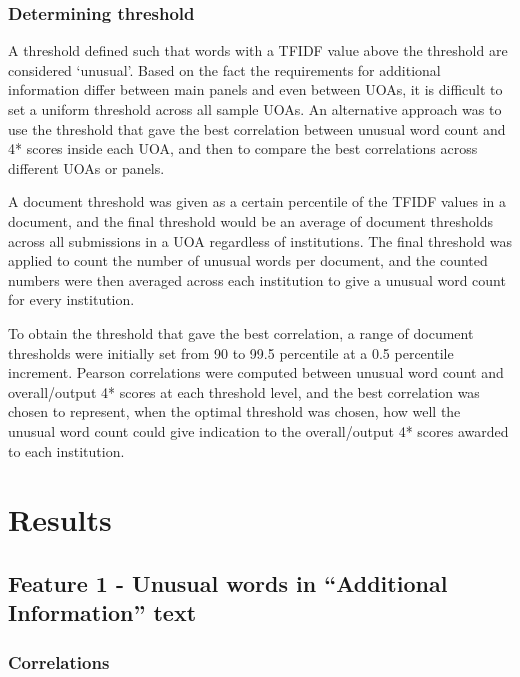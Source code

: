 \documentclass[a4paper, 11pt]{article}
\begin{document}
\subsubsection{Determining threshold}

A threshold defined such that words with a TFIDF value above the threshold are considered ‘unusual’. Based on the fact the requirements for additional information differ between main panels and even between UOAs, it is difficult to set a uniform threshold across all sample UOAs. An alternative approach was to use the threshold that gave the best correlation between unusual word count and 4* scores inside each UOA, and then to compare the best correlations across different UOAs or panels. 

A document threshold was given as a certain percentile of the TFIDF values in a document, and the final threshold would be an average of document thresholds across all submissions in a UOA regardless of institutions. The final threshold was applied to count the number of unusual words per document, and the counted numbers were then averaged across each institution to give a unusual word count for every institution.

To obtain the threshold that gave the best correlation, a range of document thresholds were initially set from 90 to 99.5 percentile at a 0.5 percentile increment. Pearson correlations were computed between unusual word count and overall/output 4* scores at each threshold level, and the best correlation was chosen to represent, when the optimal threshold was chosen, how well the unusual word count could give indication to the overall/output 4* scores awarded to each institution.




\section{Results}

\subsection{Feature 1 - Unusual words in ``Additional Information'' text}

\subsubsection{Correlations}
\end{document}
